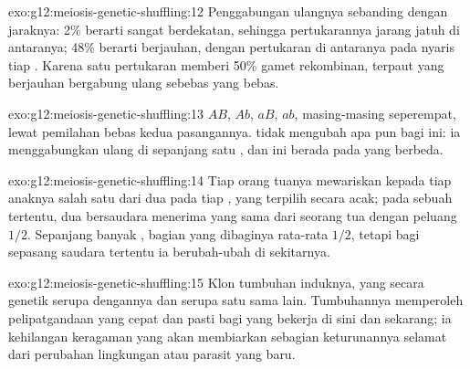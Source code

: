 \begin{solution}{exo:g12:meiosis-genetic-shuffling:12}
Penggabungan ulangnya sebanding dengan jaraknya: 2\% berarti 
sangat berdekatan, sehingga pertukarannya jarang jatuh di antaranya;
48\% berarti berjauhan, dengan pertukaran di antaranya pada nyaris tiap
. Karena satu pertukaran memberi 50\% gamet rekombinan, 
terpaut yang berjauhan bergabung ulang sebebas  yang bebas.
\end{solution}

\begin{solution}{exo:g12:meiosis-genetic-shuffling:13}
$AB$, $Ab$, $aB$, $ab$, masing-masing seperempat, lewat pemilahan bebas
kedua pasangannya.  tidak mengubah apa pun bagi  ini:
ia menggabungkan ulang  di sepanjang satu , dan  ini
berada pada  yang berbeda.
\end{solution}

\begin{solution}{exo:g12:meiosis-genetic-shuffling:14}
Tiap orang tuanya mewariskan kepada tiap anaknya salah satu dari dua
 pada tiap , yang terpilih secara acak; pada sebuah 
tertentu, dua bersaudara menerima  yang sama dari seorang tua
dengan peluang $1/2$. Sepanjang banyak , bagian yang dibaginya
rata-rata $1/2$, tetapi bagi sepasang saudara tertentu ia berubah-ubah
di sekitarnya.
\end{solution}

\begin{solution}{exo:g12:meiosis-genetic-shuffling:15}
Klon tumbuhan induknya, yang secara genetik serupa dengannya dan serupa
satu sama lain. Tumbuhannya memperoleh pelipatgandaan yang cepat dan
pasti bagi  yang bekerja di sini dan sekarang; ia kehilangan
keragaman yang akan membiarkan sebagian keturunannya selamat dari
perubahan lingkungan atau parasit yang baru.
\end{solution}

